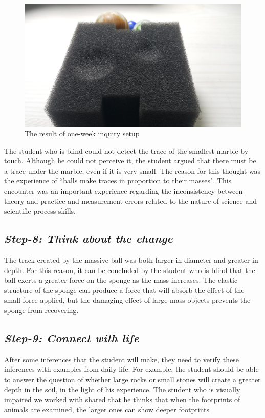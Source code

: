 \documentclass[11.5pt]{sig-alternate}
\begin{document}
\begin{large}
\begin{figure}[h]
    \centering
    \includegraphics [width=\columnwidth]{Figure3.png}
    \captionsetup{font=large, labelfont=bf}
    \caption{The result of one-week inquiry setup}
\end{figure}


The student who is blind could not detect the trace of the smallest marble by touch. Although he could not perceive it, the student argued that there must be a trace under the marble, even if it is very small. The reason for this thought was the experience of ``balls make traces in proportion to their masses". This encounter was an important experience regarding the inconsistency between theory and practice and measurement errors related to the nature of science and scientific process skills.
 
\subsection*{\textit{Step-8: Think about the change}}
The track created by the massive ball was both larger in diameter and greater in depth. For this reason, it can be concluded by the student who is blind that the ball exerts a greater force on the sponge as the mass increases. The elastic structure of the sponge can produce a force that will absorb the effect of the small force applied, but the damaging effect of large-mass objects prevents the sponge from recovering. 
 
\subsection*{\textit{Step-9: Connect with life}}
After some inferences that the student will make, they need to verify these inferences with examples from daily life. For example, the student should be able to answer the question of whether large rocks or small stones will create a greater depth in the soil, in the light of his experience. The student who is visually impaired we worked with shared that he thinks that when the footprints of animals are examined, the larger ones can show deeper footprints
 

\end{large}
\end{document}
